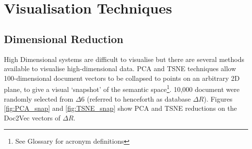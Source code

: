 \section{Visualisation Techniques}
\subsection{Dimensional Reduction}
High Dimensional systems are difficult to visualise but there are several methods available to visualise high-dimensional data. PCA \cite{PCA} and TSNE \cite{tsne1}\cite{bhtsne} techniques allow 100-dimensional document vectors to be collapsed to points on an arbitrary 2D plane, to give a visual `snapshot' of the semantic space\footnote{See Glossary for acronym definitions}. 
10,000 document were randomly selected from $\Delta6$ (referred to henceforth as database $\Delta R$).
Figures \ref{fig:PCA_snap} and \ref{fig:TSNE_snap} show PCA and TSNE reductions on the Doc2Vec vectors of $\Delta R$\cite{scikitlearn}.

